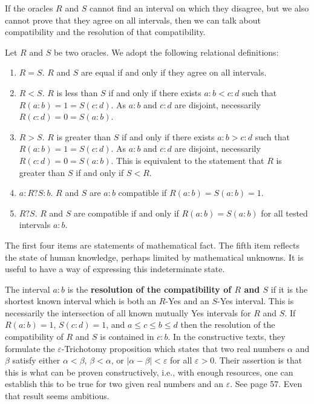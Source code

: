 \documentclass[12pt]{article}
\begin{document}
If the oracles $R$ and $S$ cannot find an interval on which they disagree, but we also cannot prove that they agree on all intervals, then we can talk about compatibility and the resolution of that compatibility.

Let $R$ and $S$ be two oracles. We adopt the following relational definitions:

\begin{enumerate}
    \item $R=S$. $R$ and $S$ are equal if and only if they agree on all intervals. 
    \item $R < S$. $R$ is less than $S$ if and only if there exists $a:b < c:d$ such that $R(a:b) =1 = S(c:d)$. As $a:b$ and $c:d$ are disjoint, necessarily $R(c:d) = 0 = S(a:b)$. 
    \item $R > S$. $R$ is greater than $S$ if and only if there exists $a:b > c:d$ such that $R(a:b) =1 = S(c:d)$. As $a:b$ and $c:d$ are disjoint, necessarily $R(c:d) = 0 = S(a:b)$. This is equivalent to the statement that $R$ is greater than $S$ if and only if $S < R$. 
    \item $a:R?S:b$. $R$ and $S$ are $a:b$ compatible if $R(a:b)=S(a:b) = 1$.
    \item $R ? S$. $R$ and $S$ are compatible if and only if $R(a:b) = S(a:b)$ for all tested intervals $a:b$. 
\end{enumerate}

The first four items are statements of mathematical fact. The fifth item reflects the state of human knowledge, perhaps limited by mathematical unknowns. It is useful to have a way of expressing this indeterminate state. 

The interval $a:b$ is the \textbf{resolution of the compatibility of $R$ and $S$} if it is the shortest known interval which is both an $R$-Yes and an $S$-Yes interval. This is necessarily the intersection of all known mutually Yes intervals for $R$ and $S$.  If $R(a:b) = 1$, $S(c:d) = 1$, and $ a \leq c \leq b \leq d$ then the resolution of the compatibility of $R$ and $S$ is contained in $c:b$. In the constructive texts, they formulate the $\varepsilon$-Trichotomy proposition which states that two real numbers $\alpha$ and $\beta$ satisfy either $\alpha < \beta$, $\beta < \alpha$, or $|\alpha - \beta| < \varepsilon$ for all $\varepsilon > 0$. Their assertion is that this is what can be proven constructively, i.e., with enough resources, one can establish this to be true for two given real numbers and an $\varepsilon$. See \cite{bridger} page 57. Even that result seems ambitious. 
\end{document}
